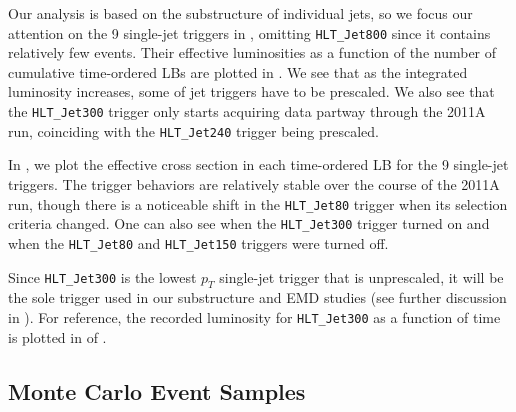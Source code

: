 \documentclass[aps,prd,twocolumn,preprintnumbers,nofootinbib,longbibliography,floatfix,superscriptaddress]{revtex4-1}
\begin{document}
Our analysis is based on the substructure of individual jets, so we focus our attention on the 9 single-jet triggers in , omitting \texttt{HLT\_Jet800} since it contains relatively few events.
%
Their effective luminosities as a function of the number of cumulative time-ordered LBs are plotted in .
%
We see that as the integrated luminosity increases, some of jet triggers have to be prescaled.
%
We also see that the \texttt{HLT\_Jet300} trigger only starts acquiring data partway through the 2011A run, coinciding with the \texttt{HLT\_Jet240} trigger being prescaled.


In , we plot the effective cross section in each time-ordered LB for the 9 single-jet triggers.
%
The trigger behaviors are relatively stable over the course of the 2011A run, though there is a noticeable shift in the \texttt{HLT\_Jet80} trigger when its selection criteria changed.
%
One can also see when the \texttt{HLT\_Jet300} trigger turned on and when the \texttt{HLT\_Jet80} and \texttt{HLT\_Jet150} triggers were turned off.


Since \texttt{HLT\_Jet300} is the lowest $p_T$ single-jet trigger that is unprescaled, it will be the sole trigger used in our substructure and EMD studies (see further discussion in ).
%
For reference, the recorded luminosity for \texttt{HLT\_Jet300} as a function of time is plotted in  of .


\subsection{Monte Carlo Event Samples}
\label{subsec:simulation}
\end{document}
